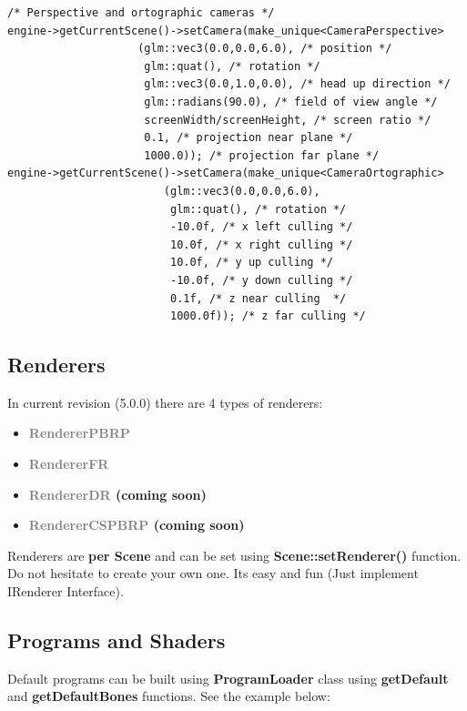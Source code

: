 \documentclass{article}
\begin{document}
\begin{lstlisting}
/* Perspective and ortographic cameras */
engine->getCurrentScene()->setCamera(make_unique<CameraPerspective>
                    (glm::vec3(0.0,0.0,6.0), /* position */
                     glm::quat(), /* rotation */                
                     glm::vec3(0.0,1.0,0.0), /* head up direction */         
                     glm::radians(90.0), /* field of view angle */        
                     screenWidth/screenHeight, /* screen ratio */
                     0.1, /* projection near plane */
                     1000.0)); /* projection far plane */
engine->getCurrentScene()->setCamera(make_unique<CameraOrtographic>
                        (glm::vec3(0.0,0.0,6.0),
                         glm::quat(), /* rotation */                
                         -10.0f, /* x left culling */
                         10.0f, /* x right culling */
                         10.0f, /* y up culling */
                         -10.0f, /* y down culling */
                         0.1f, /* z near culling  */
                         1000.0f)); /* z far culling */
\end{lstlisting}

\subsection{Renderers}\label{sec:Renderers}

\indent \indent In current revision (5.0.0) there are 4 types of renderers:

\begin{itemize}
\item \textbf{\textcolor{gray}{RendererPBRP}}
\item \textbf{\textcolor{gray}{RendererFR}}
\item \textbf{\textcolor{gray}{RendererDR} (coming soon)}
\item \textbf{\textcolor{gray}{RendererCSPBRP} (coming soon)}
\end{itemize}

\indent \indent Renderers are \textbf{per Scene} and can be set using \textbf{Scene::setRenderer()} function. Do not hesitate to create your own one. Its easy and fun (Just implement IRenderer Interface).

\subsection{Programs and Shaders}\label{sec:Programs and Shaders}
\indent \indent Default programs can be built using \textbf{ProgramLoader} class using \textbf{getDefault} and \textbf{getDefaultBones} functions. See the example below:
\end{document}
